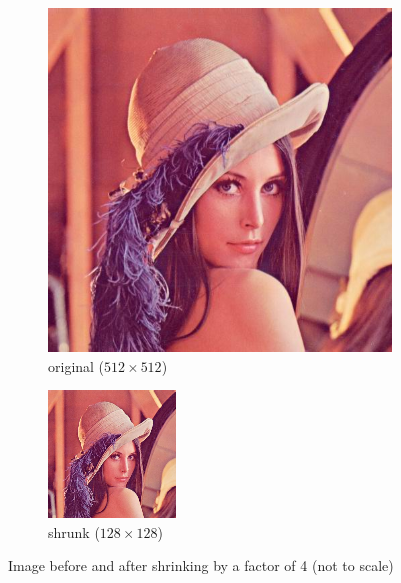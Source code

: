 \documentclass[12pt]{article}
\begin{document}
\begin{figure}[H]\centering
    \begin{subfigure}[t]{\subfiguresize}\centering
        \includegraphics[width=\textwidth]{lenac.png}
        \caption{original ($512 \times 512$)}
    \end{subfigure}
    \hspace{.05\textwidth}
    \begin{subfigure}[t]{\subfiguresize}\centering
        \includegraphics[width=.7\textwidth]{lenac_small.png}
        \caption{shrunk ($128 \times 128$)}
    \end{subfigure}
    \caption{Image before and after shrinking by a factor of 4 (not to scale)}
\end{figure}
\end{document}
